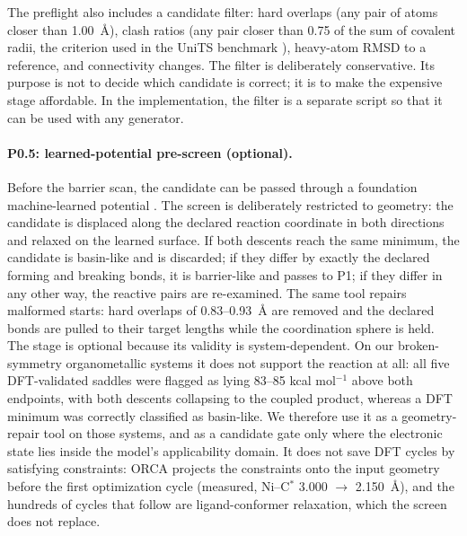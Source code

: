 \documentclass[11pt,a4paper]{article}
\begin{document}
The preflight also includes a candidate filter: hard overlaps (any pair of atoms closer than 1.00~\AA{}), clash ratios (any pair closer than 0.75 of the sum of covalent radii, the criterion used in the UniTS benchmark \citep{Xu2026UniTS}), heavy-atom RMSD to a reference, and connectivity changes. The filter is deliberately conservative. Its purpose is not to decide which candidate is correct; it is to make the expensive stage affordable. In the implementation, the filter is a separate script so that it can be used with any generator.

\paragraph{P0.5: learned-potential pre-screen (optional).}
Before the barrier scan, the candidate can be passed through a foundation machine-learned potential \citep{Husistein2026Paradigm,Neumann2024Orb,Levine2025OMol25}. The screen is deliberately restricted to geometry: the candidate is displaced along the declared reaction coordinate in both directions and relaxed on the learned surface. If both descents reach the same minimum, the candidate is basin-like and is discarded; if they differ by exactly the declared forming and breaking bonds, it is barrier-like and passes to P1; if they differ in any other way, the reactive pairs are re-examined. The same tool repairs malformed starts: hard overlaps of 0.83--0.93~\AA{} are removed and the declared bonds are pulled to their target lengths while the coordination sphere is held. The stage is optional because its validity is system-dependent. On our broken-symmetry organometallic systems it does not support the reaction at all: all five DFT-validated saddles were flagged as lying 83--85 kcal mol$^{-1}$ above both endpoints, with both descents collapsing to the coupled product, whereas a DFT minimum was correctly classified as basin-like. We therefore use it as a geometry-repair tool on those systems, and as a candidate gate only where the electronic state lies inside the model's applicability domain. It does not save DFT cycles by satisfying constraints: ORCA projects the constraints onto the input geometry before the first optimization cycle (measured, Ni--C$^*$ 3.000 $\rightarrow$ 2.150~\AA{}), and the hundreds of cycles that follow are ligand-conformer relaxation, which the screen does not replace.
\end{document}
